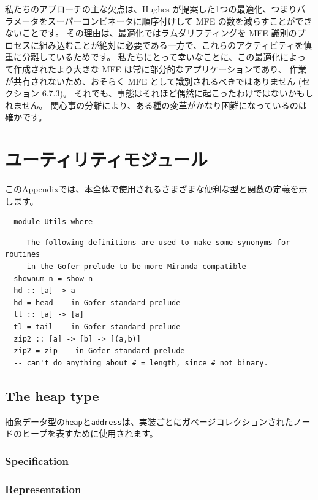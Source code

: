 \documentclass{jbook}
\begin{document}
私たちのアプローチの主な欠点は、Hughes が提案した1つの最適化、つまりパラメータをスーパーコンビネータに順序付けして MFE の数を減らすことができないことです。
その理由は、最適化ではラムダリフティングを MFE 識別のプロセスに組み込むことが絶対に必要である一方で、これらのアクティビティを慎重に分離しているためです。
私たちにとって幸いなことに、この最適化によって作成されたより大きな MFE は常に部分的なアプリケーションであり、
作業が共有されないため、おそらく MFE として識別されるべきではありません (セクション 6.7.3)。
それでも、事態はそれほど偶然に起こったわけではないかもしれません。
関心事の分離により、ある種の変革がかなり困難になっているのは確かです。
\newpage

\appendix
\chapter{ユーティリティモジュール}

このAppendixでは、本全体で使用されるさまざまな便利な型と関数の定義を示します。

\begin{verbatim}
  module Utils where
\end{verbatim}

\begin{verbatim}
  -- The following definitions are used to make some synonyms for routines
  -- in the Gofer prelude to be more Miranda compatible
  shownum n = show n
  hd :: [a] -> a
  hd = head -- in Gofer standard prelude
  tl :: [a] -> [a]
  tl = tail -- in Gofer standard prelude
  zip2 :: [a] -> [b] -> [(a,b)]
  zip2 = zip -- in Gofer standard prelude
  -- can't do anything about # = length, since # not binary.
\end{verbatim}

\section{The heap type}

抽象データ型の\texttt{heap}と\texttt{address}は、実装ごとにガベージコレクションされたノードのヒープを表すために使用されます。

\subsection{Specification}
\subsection{Representation}
\newpage
\end{document}
